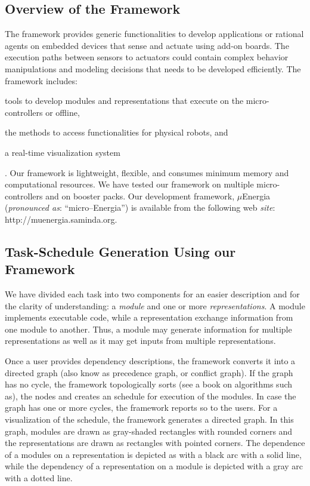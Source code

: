 \documentclass[]{IEEEtran}
\begin{document}
\subsection{Overview of the Framework}
\label{sec:OverviewOfTheFramework}

\par
The framework provides generic functionalities to develop applications or
rational agents on embedded devices that sense and actuate using add-on boards.
The execution paths between sensors to actuators could contain complex behavior
manipulations and modeling decisions that needs to be developed efficiently.
The framework includes: \begin{inparaenum}[($i$)] \item tools to develop
modules and representations that execute on the micro-controllers or offline,
\item the methods to access functionalities for physical robots, and \item a
real-time visualization system\end{inparaenum}. Our framework is lightweight,
flexible, and consumes minimum memory and computational resources. We have
tested our framework on multiple micro-controllers and on booster packs.  Our
development framework, $\mu$Energia (\textit{pronounced as}:
``micro--Energia'') is available from the following web \textit{site}:
{http://muenergia.saminda.org}.

\subsection{Task-Schedule Generation Using our Framework}
\label{FrameWorkDescription}


We have divided each task into two components for an easier description and for
the clarity of understanding: a {\em module} and one or more {\em
representations}. A module implements executable code, while a representation
exchange information from one module to another. Thus, a module may generate
information for multiple representations as well as it may get inputs from
multiple representations.  \par Once a user provides dependency descriptions,
the framework converts it  into a directed graph (also know as precedence
graph, or conflict graph).  If the graph has no cycle, the framework
topologically sorts (see a book on algorithms such
as\cite{Cormen:AlgorithmBook}), the nodes and creates an schedule for execution
of the modules. In case the graph has one or more cycles, the framework reports
so to the users.  For a visualization of the schedule, the framework  generates
a directed graph. In this graph, modules are drawn as gray-shaded rectangles
with rounded corners and the representations are drawn as rectangles with pointed corners. The
dependence of a modules on a representation is depicted as with a black arc with a solid line, while
the
dependency of a representation on a module is depicted with a gray arc with a
dotted line. 
\end{document}
